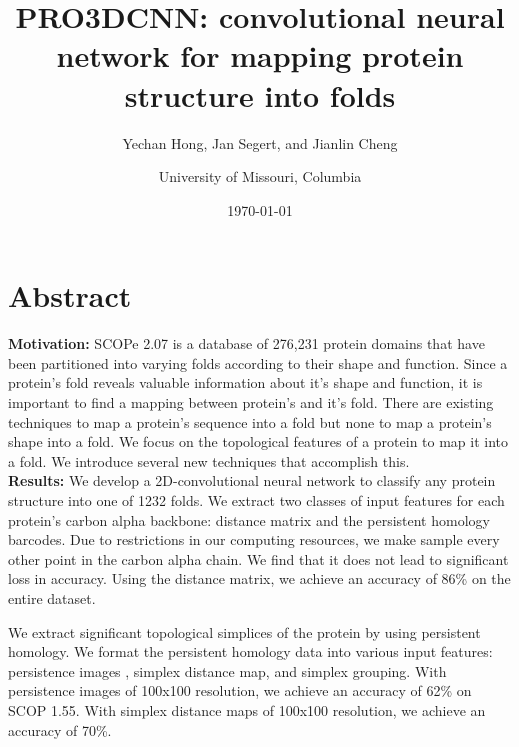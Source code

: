 \documentclass[12pt, a4paper, twocolumn, fullpage]{article}
\title{PRO3DCNN: convolutional neural network for mapping protein structure into folds}
\author{Yechan Hong, Jan Segert, and Jianlin Cheng
\and University of Missouri, Columbia}
\date{\today}
\theoremstyle{plain}
\theoremstyle{definition}
\theoremstyle{remark}
\begin{document}
\tableofcontents
\maketitle

\section*{Abstract}

\textbf{Motivation:} SCOPe 2.07 is a database of 276,231 protein domains that have been partitioned into varying folds according to their shape and function. Since a protein's fold reveals valuable information about it's shape and function, it is important to find a mapping between protein's and it's fold. There are existing techniques to map a protein's sequence into a fold \cite{deepsf} but none to map a protein's shape into a fold. We focus on the topological features of a protein to map it into a fold. We introduce several new techniques that accomplish this.
\\
\textbf{Results:} We develop a 2D-convolutional neural network to classify any protein structure into one of 1232 folds. 
We extract two classes of input features for each protein's carbon alpha backbone: distance matrix and the persistent homology barcodes. Due to restrictions in our computing resources, we make sample every other point in the carbon alpha chain. We find that it does not lead to significant loss in accuracy.
Using the distance matrix, we achieve an accuracy of 86\% on the entire dataset.

We extract significant topological simplices of the protein by using persistent homology. We format the persistent homology data into various input features: persistence images \cite{persistenceImages}, simplex distance map, and simplex grouping.  With persistence images of 100x100 resolution, we achieve an accuracy of 62\% on SCOP 1.55. With simplex distance maps of 100x100 resolution, we achieve an accuracy of 70\%.
    

\end{document}
